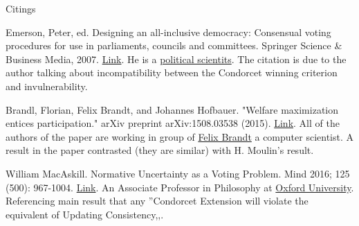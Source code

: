 \documentclass[12pt]{article}
\newenvironment{answer}[2][Answer]{\begin{trivlist}
\item[\hskip \labelsep {\bfseries #1}\hskip \labelsep {\bfseries #2:}]}{\end{trivlist}}
\begin{document}
\begin{answer}{d)}{Citings}

Emerson, Peter, ed. Designing an all-inclusive democracy: Consensual voting procedures for use in parliaments, councils and committees. Springer Science \& Business Media, 2007. \href{https://books.google.nl/books?hl=en&lr=&id=9mM67vrwz64C&oi=fnd&pg=PR7&ots=4racgvSsRl&sig=UY4F1d51wmhIVBF9R7YL6Upf3j8#v=onepage&q&f=false}{Link}.
He is a \href{https://www.researchgate.net/profile/Peter_Emerson/info}{political scientits}.
The citation is due to the author talking about incompatibility between the Condorcet winning criterion and invulnerability.

Brandl, Florian, Felix Brandt, and Johannes Hofbauer. "Welfare maximization entices participation." arXiv preprint arXiv:1508.03538 (2015).
\href{https://arxiv.org/pdf/1508.03538.pdf}{Link}.
All of the authors of the paper are working in group of \href{http://dss.in.tum.de/staff/brandt.html}{Felix Brandt} a computer scientist.
A result in the paper contrasted (they are similar) with H. Moulin's result.

William MacAskill. Normative Uncertainty as a Voting Problem. Mind 2016; 125 (500): 967-1004.
\href{https://academic.oup.com/mind/article-lookup/doi/10.1093/mind/fzv169}{Link}.
An Associate Professor in Philosophy at \href{https://www.fhi.ox.ac.uk/team/william-macaskill/}{Oxford University}.
Referencing main result that any ''Condorcet Extension will violate the equivalent of Updating Consistency,,.
\end{answer}
\end{document}
